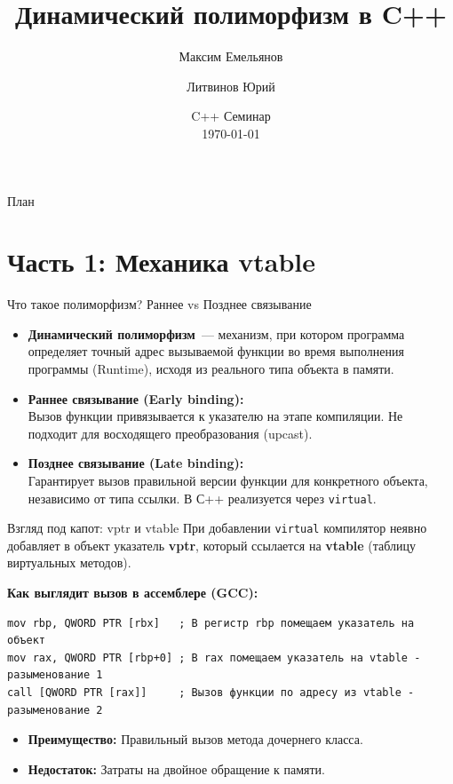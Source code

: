 \documentclass[10pt, aspectratio=169]{beamer}
\title{Динамический полиморфизм в C++}
\author{Максим Емельянов \and Литвинов Юрий}
\date{C++ Семинар \\ \today}
\begin{document}
\begin{frame}[plain]
    \titlepage
\end{frame}

\begin{frame}{План}
    \tableofcontents
\end{frame}

\section{Часть 1: Механика vtable}

\begin{frame}{Что такое полиморфизм? Раннее vs Позднее связывание}
    \begin{itemize}
        \item \textbf{Динамический полиморфизм}~--- механизм, при котором программа определяет точный адрес вызываемой функции во время выполнения программы (Runtime), исходя из реального типа объекта в памяти.
        \vspace{0.3cm}
        \item \textbf{Раннее связывание (Early binding):}\\
        Вызов функции привязывается к указателю на этапе компиляции. Не подходит для восходящего преобразования (upcast).
        \vspace{0.3cm}
        \item \textbf{Позднее связывание (Late binding):}\\
        Гарантирует вызов правильной версии функции для конкретного объекта, независимо от типа ссылки. В С++ реализуется через \texttt{virtual}.
    \end{itemize}
\end{frame}

\begin{frame}[fragile]{Взгляд под капот: vptr и vtable}
    При добавлении \texttt{virtual} компилятор неявно добавляет в объект указатель \textbf{vptr}, который ссылается на \textbf{vtable} (таблицу виртуальных методов).

    \vspace{0.3cm}
    \textbf{Как выглядит вызов в ассемблере (GCC):}
\begin{lstlisting}[language={[x86masm]Assembler}]
mov rbp, QWORD PTR [rbx]   ; В регистр rbp помещаем указатель на объект
mov rax, QWORD PTR [rbp+0] ; В rax помещаем указатель на vtable - разыменование 1
call [QWORD PTR [rax]]     ; Вызов функции по адресу из vtable - разыменование 2
\end{lstlisting}

    \begin{itemize}
        \item \textbf{Преимущество:} Правильный вызов метода дочернего класса.
        \item \textbf{Недостаток:} Затраты на двойное обращение к памяти.
    \end{itemize}
\end{frame}
\end{document}
